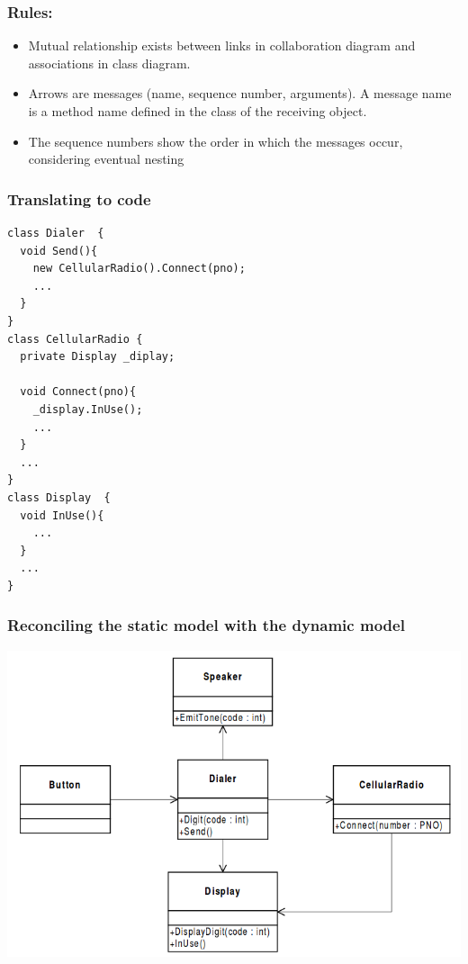 \documentclass{beamer}
\begin{document}
\begin{frame}
	\frametitle{Rules:}
	\begin{itemize}
  		\item Mutual relationship exists between links in collaboration diagram and associations in class diagram.
  		\item Arrows are messages (name, sequence number, arguments). A message name is a method name defined in the class of the receiving object. 
  		\item The sequence numbers show the order in which the messages occur, considering eventual nesting
	\end{itemize}
\end{frame}

\begin{frame}[containsverbatim]
	\frametitle{Translating to code}
	\begin{lstlisting}
class Dialer  {   
  void Send(){  	
  	new CellularRadio().Connect(pno);
  	...
  }
}
class CellularRadio {   
  private Display _diplay;
  
  void Connect(pno){  	
  	_display.InUse();
  	...
  }
  ...
}
class Display  {   
  void InUse(){
  	...
  }
  ...
}
\end{lstlisting}
\end{frame}

\begin{frame}
	\frametitle{Reconciling the static model with the dynamic model}
	\begin{center}
		\includegraphics[scale=0.38]{properStatic}
	\end{center}
\end{frame}
\end{document}
